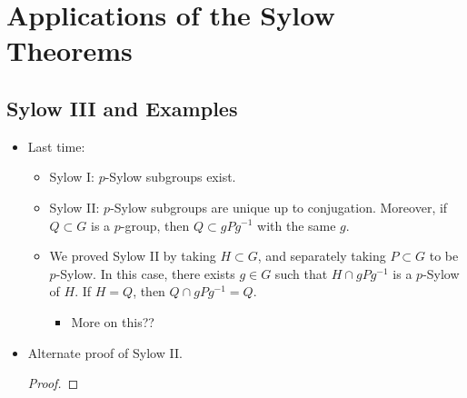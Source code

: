 \documentclass[../notes.tex]{subfiles}
\begin{document}
\chapter{Applications of the Sylow Theorems}
\section{Sylow III and Examples}
\begin{itemize}
    \item {}Last time:
    \begin{itemize}
        \item Sylow I: $p$-Sylow subgroups exist.
        \item Sylow II: $p$-Sylow subgroups are unique up to conjugation. Moreover, if $Q\subset G$ is a $p$-group, then $Q\subset gPg^{-1}$ with the same $g$.
        \item We proved Sylow II by taking $H\subset G$, and separately taking $P\subset G$ to be $p$-Sylow. In this case, there exists $g\in G$ such that $H\cap gPg^{-1}$ is a $p$-Sylow of $H$. If $H=Q$, then $Q\cap gPg^{-1}=Q$.
        \begin{itemize}
            \item More on this??
        \end{itemize}
    \end{itemize}
    \item Alternate proof of Sylow II.
    \begin{proof}



\end{proof}
\end{itemize}
\end{document}
